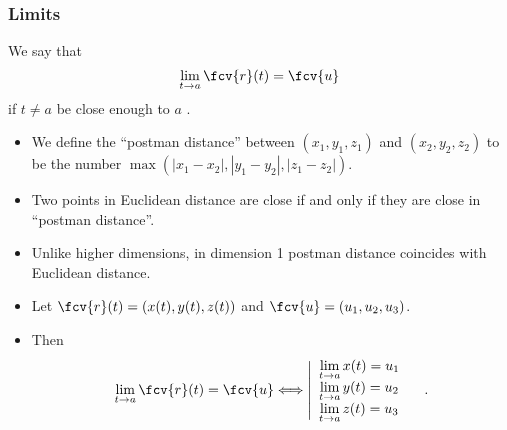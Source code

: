 
\begin{frame}
\frametitle{Limits}
\begin{definition}
We say that $$\lim_{t\to a} \fcv{r}(t) = \fcv{u}$$ if  $t\neq a$ be close enough to $a$  .

\medskip

\end{definition}
\end{frame}

\begin{frame}
\begin{itemize}
\item We define the ``postman distance'' between $(x_1,y_1,z_1)$ and $(x_2, y_2, z_2)$ to be the number $\max(|x_1-x_2|, |y_1-y_2|, |z_1-z_2|) $.
\item<2-> Two points in Euclidean distance are close if and only if they are close in ``postman distance''.
\item<3-> Unlike higher dimensions, in dimension 1 postman distance coincides with Euclidean distance.
\item<4-> Let $\fcv{r}(t) = ( x(t), y(t), z(t) )$ and $\fcv{u}=( u_1,u_2,u_3)$.
\item<5-> Then
\[
\lim_{t\to a} \fcv{r}(t) = \fcv{u} \Longleftrightarrow
\left|
\begin{array}{l}
\lim\limits_{t\to a} x(t) = u_1\\
\lim\limits_{t\to a} y(t) = u_2\\
\lim\limits_{t\to a} z(t) = u_3\\
\end{array}
\right.\quad .
\]
\end{itemize}
\end{frame}
